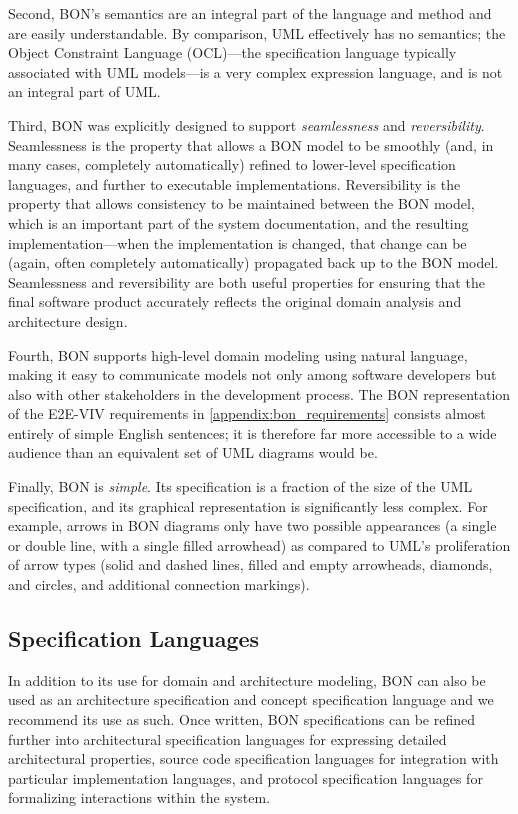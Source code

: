 Second, BON's semantics are an integral part of the language and
method and are easily understandable. By comparison, UML effectively
has no semantics; the Object Constraint Language (OCL)---the
specification language typically associated with UML models---is a
very complex expression language, and is not an integral part of UML.

Third, BON was explicitly designed to support \emph{seamlessness} and
\emph{reversibility}. Seamlessness is the property that allows a BON
model to be smoothly (and, in many cases, completely automatically)
refined to lower-level specification languages, and further to
executable implementations. Reversibility is the property that allows
consistency to be maintained between the BON model, which is an
important part of the system documentation, and the resulting
implementation---when the implementation is changed, that change can
be (again, often completely automatically) propagated back up to the
BON model. Seamlessness and reversibility are both useful properties
for ensuring that the final software product accurately reflects the
original domain analysis and architecture design.

Fourth, BON supports high-level domain modeling using natural
language, making it easy to communicate models not only among software
developers but also with other stakeholders in the development
process. The BON representation of the E2E-VIV requirements in
\autoref{appendix:bon_requirements} consists almost entirely of simple
English sentences; it is therefore far more accessible to a wide
audience than an equivalent set of UML diagrams would be.

Finally, BON is \emph{simple}. Its specification is a fraction of the
size of the UML specification, and its graphical representation is
significantly less complex. For example, arrows in BON diagrams only
have two possible appearances (a single or double line, with a single
filled arrowhead) as compared to UML's proliferation of arrow types
(solid and dashed lines, filled and empty arrowheads, diamonds, and
circles, and additional connection markings). 

\subsection{Specification Languages}

In addition to its use for domain and architecture modeling, BON can
also be used as an architecture specification and concept
specification language and we recommend its use as such. Once written,
BON specifications can be refined further into architectural
specification languages for expressing detailed architectural
properties, source code specification languages for integration with
particular implementation languages, and protocol specification
languages for formalizing interactions within the system.

